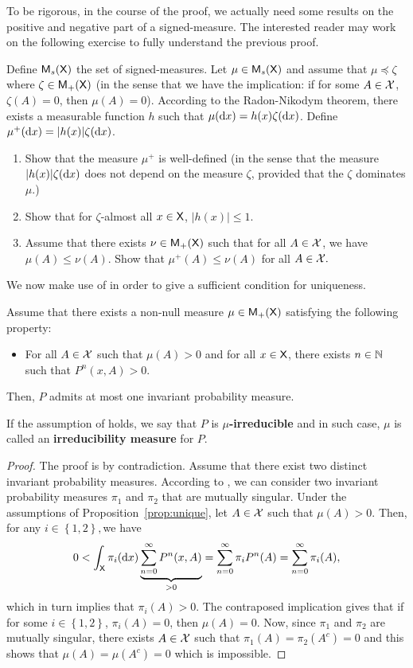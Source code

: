 \documentclass[english,graybox,envcountchap,envcountsame,sectrefs,shortlabels]{svmono}
\theoremstyle{style}
\newenvironment{svmultproof}{\small \begin{proof}}{\end{proof}}
\newcommand{\bs}{\begin{shaded}}
\newcommand{\es}{\end{shaded}}
\newcommand{\blb}{\begin{leftbar}}
\newcommand{\elb}{\end{leftbar}}
\begin{document}
To be rigorous, in the course of the proof, we actually need some
results on the positive and negative part of a signed-measure. The
interested reader may work on the following exercise to fully understand
the previous proof. \blb
\begin{exercise}
Define $\mathsf{M}_{s}(\mathsf{X})$ the set of signed-measures. Let $\mu\in\mathsf{M}_{s}(\mathsf{X})$
and assume that $\mu\preceq\zeta$ where $\zeta\in\mathsf{M}_{+}(\mathsf{X})$
(in the sense that we have the implication: if for some $A\in\mathcal{X}$,
$\zeta(A)=0$, then $\mu(A)=0$). According to the Radon-Nikodym theorem,
there exists a measurable function $h$ such that $\mu(\mathrm{d} x)=h(x)\zeta(\mathrm{d} x)$.
Define $\mu^{+}(\mathrm{d} x)=|h(x)|\zeta(\mathrm{d} x)$.
\begin{enumerate}
\item Show that the measure $\mu^{+}$ is well-defined (in the sense that
the measure $|h(x)|\zeta(\mathrm{d} x)$ does not depend on the measure
$\zeta$, provided that the $\zeta$ dominates $\mu$.)
\item Show that for $\zeta$-almost all $x\in\mathsf{X}$, $|h(x)|\leq1$.
\item Assume that there exists $\nu\in\mathsf{M}_{+}(\mathsf{X})$ such that for all
$A\in\mathcal{X}$, we have $\mu(A)\leq\nu(A)$. Show that $\mu^{+}(A)\leq\nu(A)$
for all $A\in\mathcal{X}.$
\end{enumerate}
\end{exercise}
\elb We now make use of  in order to
give a sufficient condition for uniqueness.

\bs
\begin{proposition}
\label{prop:unique}Assume that there exists a non-null measure \textup{$\mu\in\mathsf{M}_{+}(\mathsf{X})$}
satisfying the following property:
\begin{itemize}
\item For all $A\in\mathcal{X}$ such that $\mu(A)>0$ and for all $x\in\mathsf{X}$,
there exists $n\in\mathbb{N}$ such that $P^{n}(x,A)>0$.
\end{itemize}
Then, $P$ admits at most one invariant probability measure.
\end{proposition}
\es If the assumption of  holds, we say that $P$
is \textbf{$\mu$-irreducible} and in such case, $\mu$ is called
an \textbf{irreducibility measure} for $P$.
\begin{svmultproof}
The proof is by contradiction. Assume that there exist two distinct
invariant probability measures. According to ,
we can consider two invariant probability measures $\pi_{1}$ and
$\pi_{2}$ that are mutually singular. Under the assumptions of 
Proposition~\ref{prop:unique}, let $A\in\mathcal{X}$ such that $\mu(A)>0$. Then, for any
$i\in\left\{ 1,2\right\} ,$we have
\[
0<\int_{\mathsf{X}}\pi_{i}(\mathrm{d} x)\underbrace{\sum_{n=0}^{\infty}P^{n}(x,A)}_{>0}=\sum_{n=0}^{\infty}\pi_{i}P^{n}(A)=\sum_{n=0}^{\infty}\pi_{i}(A),
\]
which in turn implies that $\pi_{i}(A)>0$. The contraposed implication
gives that if for some $i\in\left\{ 1,2\right\} $, $\pi_{i}(A)=0$,
then $\mu(A)=0$. Now, since $\pi_1$ and $\pi_2$ 
are mutually singular, there exists $A\in\mathcal{X}$ such that $\pi_{1}(A)=\pi_{2}(A^{c})=0$
and this shows that $\mu(A)=\mu(A^{c})=0$ which is impossible.
\end{svmultproof}
\end{document}
